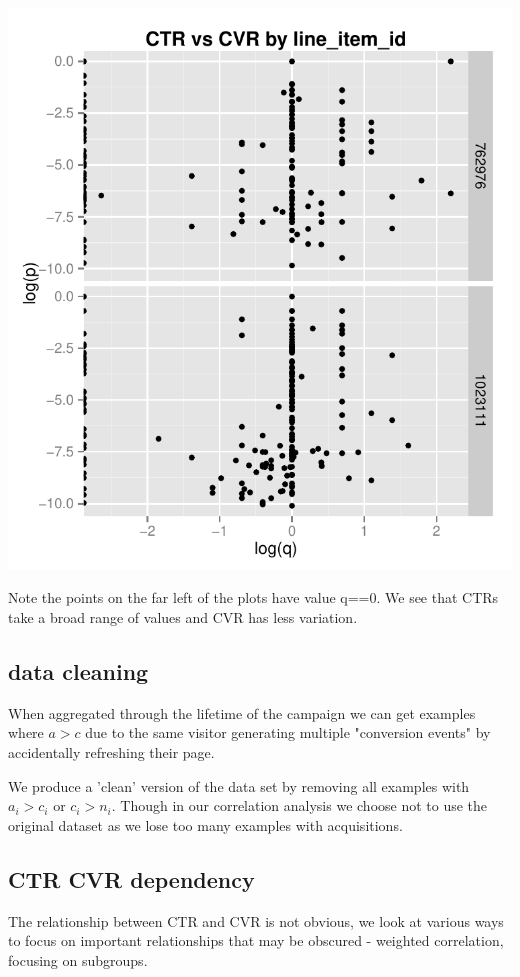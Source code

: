 \documentclass[11pt,a4,singlespacing,titlepagenumber=on]{scrreprt}
\numberwithin{equation}{chapter} %
\theoremstyle{remark}
\begin{document}
\includegraphics{CTRvsCVR}

Note the points on the far left of the plots have value q==0.  We see that CTRs take a broad range of values and CVR has less variation. 

\subsection{data cleaning}

When aggregated through the lifetime of the campaign we can get examples where $a>c$ due to the same visitor generating multiple "conversion events" by accidentally refreshing their page.

We produce a 'clean' version of the data set by removing all examples with $a_i > c_i$ or $c_i > n_i$. Though in our correlation analysis we choose not to use the original dataset as we lose too many examples with acquisitions.

\subsection{CTR CVR dependency}

The relationship between CTR and CVR is not obvious, we look at various ways to focus on important relationships that may be obscured - weighted correlation, focusing on subgroups.
\end{document}

